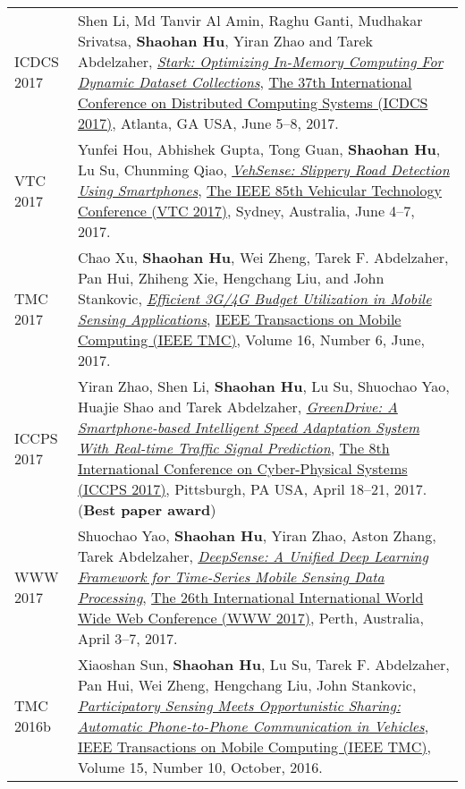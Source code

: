 \begin{longtabu}{p{.51\sectionwidth} p{.78\resumewidth}}
{\sc ICDCS 2017}\hypertarget{li2017icdcs}{} &
Shen Li, Md Tanvir Al Amin, Raghu Ganti, Mudhakar Srivatsa, \textbf{Shaohan Hu}, Yiran Zhao and Tarek Abdelzaher,
\href{http://ieeexplore.ieee.org/document/7979959}{\emph{Stark: Optimizing In-Memory Computing For Dynamic Dataset Collections}},
\href{http://icdcs2017.gatech.edu/}{\textsf{The 37th International Conference on Distributed Computing Systems (ICDCS 2017)}},
Atlanta, GA USA, June 5--8, 2017. \\

{\sc VTC 2017}\hypertarget{hou2017vtc}{} &
Yunfei Hou, Abhishek Gupta, Tong Guan, \textbf{Shaohan Hu}, Lu Su, Chunming Qiao,
\href{https://arxiv.org/abs/1705.03955}{\emph{VehSense: Slippery Road Detection Using Smartphones}},
\href{http://ieeevtc.org/vtc2017spring}{\textsf{The IEEE 85th Vehicular Technology Conference (VTC 2017)}},
Sydney, Australia, June 4--7, 2017. \\

{\sc TMC 2017}\hypertarget{xu2017tmc}{} &
Chao Xu, \textbf{Shaohan Hu}, Wei Zheng, Tarek F. Abdelzaher, Pan Hui, Zhiheng Xie, Hengchang Liu, and John Stankovic,
\href{http://ieeexplore.ieee.org/document/7539667}{\emph{Efficient 3G/4G Budget Utilization in Mobile Sensing Applications}},
\href{http://www.computer.org/web/tmc}{\textsf{IEEE Transactions on Mobile Computing (IEEE TMC)}},
Volume 16, Number 6, June, 2017. \\

{\sc ICCPS 2017}\hypertarget{zhao2017iccps}{} &
Yiran Zhao, Shen Li, \textbf{Shaohan Hu}, Lu Su, Shuochao Yao, Huajie Shao and Tarek Abdelzaher,
\href{http://dl.acm.org/citation.cfm?id=3055009}{\emph{GreenDrive: A Smartphone-based Intelligent Speed Adaptation System With Real-time Traffic Signal Prediction}},
\href{http://iccps2017.cse.wustl.edu}{\textsf{The 8th International Conference on Cyber-Physical Systems (ICCPS 2017)}},
Pittsburgh, PA USA, April 18--21, 2017. (\textbf{Best paper award}) \\

{\sc WWW 2017}\hypertarget{yao2017www}{} &
Shuochao Yao, \textbf{Shaohan Hu}, Yiran Zhao, Aston Zhang, Tarek Abdelzaher,
\href{http://dl.acm.org/citation.cfm?id=3052577}{\emph{DeepSense: A Unified Deep Learning Framework for Time-Series Mobile Sensing Data Processing}},
\href{http://www.www2017.com.au/}{\textsf{The 26th International International World Wide Web Conference (WWW 2017)}},
Perth, Australia, April 3--7, 2017. \\

{\sc TMC 2016b}\hypertarget{hu2015tmc}{} &
Xiaoshan Sun, \textbf{Shaohan Hu}, Lu Su, Tarek F. Abdelzaher, Pan Hui, Wei Zheng, Hengchang Liu, John Stankovic,
\href{http://ieeexplore.ieee.org/document/7337442}{\emph{Participatory Sensing Meets Opportunistic Sharing: Automatic Phone-to-Phone Communication in Vehicles}},
\href{http://www.computer.org/web/tmc}{\textsf{IEEE Transactions on Mobile Computing (IEEE TMC)}},
Volume 15, Number 10, October, 2016. \\


\end{longtabu}
